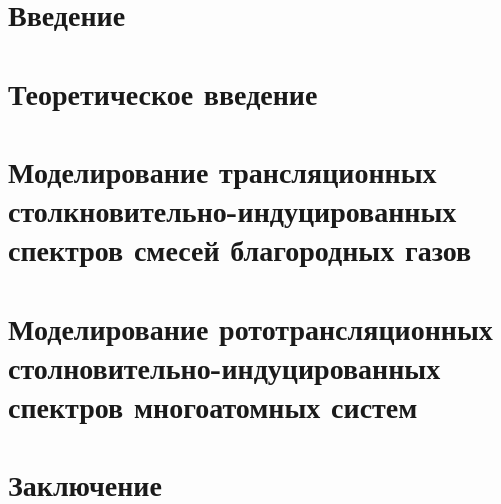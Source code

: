 \documentclass[12pt, a4paper, oneside]{extbook}
\begin{document}


\tableofcontents

\chapter{Введение}


\chapter{Теоретическое введение}


\chapter{Моделирование трансляционных столкновительно-индуцированных спектров смесей благородных газов} \label{chapter:two-atom}


\chapter{Моделирование рототрансляционных столновительно-индуцированных спектров многоатомных систем}


\chapter{Заключение}


%



%

\end{document}
